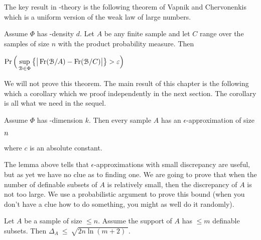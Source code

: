 \documentclass[sputnik.tex]{subfiles}
\begin{document}
The key result in \vc-theory is the following theorem of Vapnik and Chervonenkis which is a uniform version of the weak law of large numbers. 

\begin{theorem}\label{thm_vc}
\def\ceq#1#2#3{\parbox[t]{40ex}{$\displaystyle #1$}\medrel{#2}{$\displaystyle #3$}}
Assume $\Phi$ has \vc-density $d$. Let $A$ be any finite sample and let $C$ range over the samples of size $n$ with the product probability measure. Then 

\ceq{\hfill\Pr\Big(\sup_{\B\in\Phi}\big\{\big|\Fr(\B/A) - \Fr(\B/C)\big|\big\}>\epsilon\Big)}{\le}{8\,d\exp\Big(-\frac{n\epsilon^2}{32}\Big)}\QED
\end{theorem}

We will not prove this theorem. The main result of this chapter is the following which a corollary which we proof independently in the next section. The corollary is all what we need in the sequel.

\begin{corollary}\label{corol_epsilon_approx}
\def\ceq#1#2#3{\parbox[t]{20ex}{$\displaystyle #1$}\medrel{#2}{$\displaystyle #3$}}
Assume $\Phi$ has \vc-dimension $k$. Then every sample $A$ has an $\epsilon$-approximation of size 

\ceq{\hfill n}{\le}{c\,\frac{k}{\epsilon^{\scriptscriptstyle 2}}\ln\frac k\epsilon}

where $c$ is an absolute constant.
\end{corollary}

The lemma above tells that $\epsilon$-approximations with small discrepancy are useful, but as yet we have no clue as to finding one.
We are going to prove that when the number of definable subsets of $A$ is relatively small, then the discrepancy of $A$ is not too large.
We use a probabilistic argument to prove this bound (when you don't have a clue how to do something, you might as well do it randomly).


\begin{lemma}\label{lem_discrepanzarandom} 
Let $A$ be a sample of size $\le n$. Assume the support of $A$ has $\le m$  definable subsets. Then $\Delta_A\ \le\ \sqrt{2n\ln(m+2)\;}$.
\end{lemma}
\end{document}
